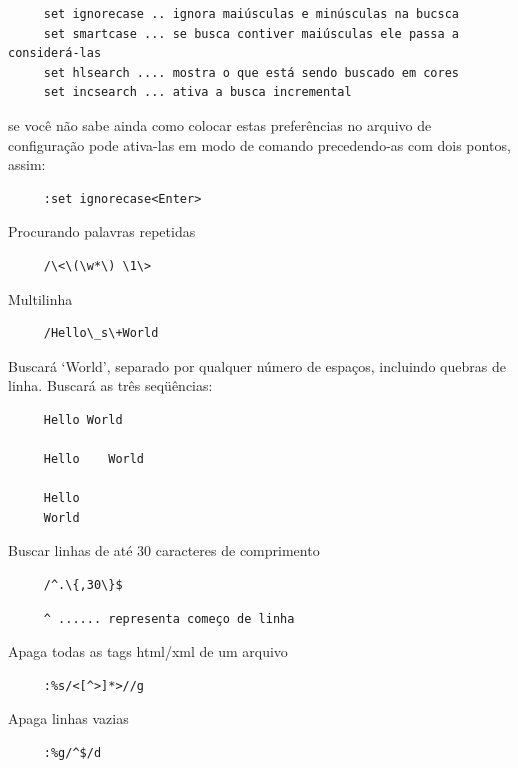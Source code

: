 \documentclass[10pt,a4paper,openany]{book}
\begin{document}
\begin{verbatim}
     set ignorecase .. ignora maiúsculas e minúsculas na bucsca
     set smartcase ... se busca contiver maiúsculas ele passa a considerá-las
     set hlsearch .... mostra o que está sendo buscado em cores
     set incsearch ... ativa a busca incremental
\end{verbatim}

se você não sabe ainda como colocar estas preferências no arquivo de configuração pode
ativa-las em modo de comando precedendo-as com dois pontos, assim:

\begin{verbatim}
     :set ignorecase<Enter>
\end{verbatim}

Procurando palavras repetidas

\begin{verbatim}
     /\<\(\w*\) \1\>
\end{verbatim}

Multilinha

\begin{verbatim}
     /Hello\_s\+World
\end{verbatim}

Buscará `World', separado por qualquer número de espaços,
incluindo quebras de linha. Buscará as três seqüências:

\begin{verbatim}
     Hello World
     
     Hello    World
     
     Hello
     World
\end{verbatim}

Buscar linhas de até 30 caracteres de comprimento

\begin{verbatim}
     /^.\{,30\}$
\end{verbatim}

\begin{verbatim}
     ^ ...... representa começo de linha
\end{verbatim}

Apaga todas as tags html/xml de um arquivo

\begin{verbatim}
     :%s/<[^>]*>//g
\end{verbatim}

Apaga linhas vazias

\begin{verbatim}
     :%g/^$/d
\end{verbatim}
\end{document}
